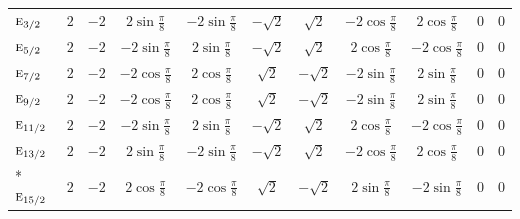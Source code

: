 \documentclass[10pt,a4paper]{article}
\numberwithin{equation}{section}
\newcommand{\irr}[1]{\text{\normalfont\scshape #1}}
\begin{document}
{{\begin{longtable}{@{}lcccccccccc@{}}
$\irr{e}_{3/2}$ & $2$ & $-2$ & $2\sin\tfrac{\pi}{8}$ & $-2\sin\tfrac{\pi}{8}$ & $-\sqrt{2}$ & $\sqrt{2}$ & $-2\cos\tfrac{\pi}{8}$ & $2\cos\tfrac{\pi}{8}$ & $0$ & $0$\\
$\irr{e}_{5/2}$ & $2$ & $-2$ & $-2\sin\tfrac{\pi}{8}$ & $2\sin\tfrac{\pi}{8}$ & $-\sqrt{2}$ & $\sqrt{2}$ & $2\cos\tfrac{\pi}{8}$ & $-2\cos\tfrac{\pi}{8}$ & $0$ & $0$\\
$\irr{e}_{7/2}$ & $2$ & $-2$ & $-2\cos\tfrac{\pi}{8}$ & $2\cos\tfrac{\pi}{8}$ & $\sqrt{2}$ & $-\sqrt{2}$ & $-2\sin\tfrac{\pi}{8}$ & $2\sin\tfrac{\pi}{8}$ & $0$ & $0$\\
$\irr{e}_{9/2}$ & $2$ & $-2$ & $-2\cos\tfrac{\pi}{8}$ & $2\cos\tfrac{\pi}{8}$ & $\sqrt{2}$ & $-\sqrt{2}$ & $-2\sin\tfrac{\pi}{8}$ & $2\sin\tfrac{\pi}{8}$ & $0$ & $0$\\
$\irr{e}_{11/2}$ & $2$ & $-2$ & $-2\sin\tfrac{\pi}{8}$ & $2\sin\tfrac{\pi}{8}$ & $-\sqrt{2}$ & $\sqrt{2}$ & $2\cos\tfrac{\pi}{8}$ & $-2\cos\tfrac{\pi}{8}$ & $0$ & $0$\\
$\irr{e}_{13/2}$ & $2$ & $-2$ & $2\sin\tfrac{\pi}{8}$ & $-2\sin\tfrac{\pi}{8}$ & $-\sqrt{2}$ & $\sqrt{2}$ & $-2\cos\tfrac{\pi}{8}$ & $2\cos\tfrac{\pi}{8}$ & $0$ & $0$\\*
$\irr{e}_{15/2}$ & $2$ & $-2$ & $2\cos\tfrac{\pi}{8}$ & $-2\cos\tfrac{\pi}{8}$ & $\sqrt{2}$ & $-\sqrt{2}$ & $2\sin\tfrac{\pi}{8}$ & $-2\sin\tfrac{\pi}{8}$ & $0$ & $0$\\
\bottomrule\end{longtable}}}
\end{document}
